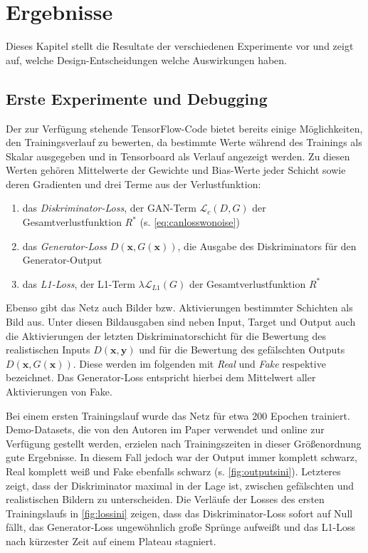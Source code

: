 \chapter{Ergebnisse}

Dieses Kapitel stellt die Resultate der verschiedenen Experimente vor und zeigt auf, welche Design-Entscheidungen welche Auswirkungen haben.



\section{Erste Experimente und Debugging}

Der zur Verfügung stehende TensorFlow-Code bietet bereits einige Möglichkeiten, den Trainingsverlauf zu bewerten, da bestimmte Werte während des Trainings als Skalar ausgegeben und in Tensorboard als Verlauf angezeigt werden.
Zu diesen Werten gehören Mittelwerte der Gewichte und Bias-Werte jeder Schicht sowie deren Gradienten und drei Terme aus der Verlustfunktion:

\begin{enumerate}
	\item das \emph{Diskriminator-Loss}, der GAN-Term $ \mathcal{L}_c(D, G) $ der Gesamtverlustfunktion $ R^* $ (s. \autoref{eq:canlosswonoise})
	\item das \emph{Generator-Loss} $ D(\mathbf{x}, G(\mathbf{x})) $, die Ausgabe des Diskriminators für den Generator-Output
	\item das \emph{L1-Loss}, der L1-Term $ \lambda \mathcal{L}_{L1}(G) $ der Gesamtverlustfunktion $ R^* $
\end{enumerate}

Ebenso gibt das Netz auch Bilder bzw. Aktivierungen bestimmter Schichten als Bild aus.
Unter diesen Bildausgaben sind neben Input, Target und Output auch die Aktivierungen der letzten Diskriminatorschicht für die Bewertung des realistischen Inputs $ D(\mathbf{x}, \mathbf{y}) $ und für die Bewertung des gefälschten Outputs $ D(\mathbf{x}, G(\mathbf{x})) $.
Diese werden im folgenden mit \emph{Real} und \emph{Fake} respektive bezeichnet.
Das Generator-Loss entspricht hierbei dem Mittelwert aller Aktivierungen von Fake.

Bei einem ersten Trainingslauf wurde das Netz für etwa 200 Epochen trainiert.
Demo-Datasets, die von den Autoren im Paper verwendet und online zur Verfügung gestellt werden, erzielen nach Trainingszeiten in dieser Größenordnung gute Ergebnisse.
In diesem Fall jedoch war der Output immer komplett schwarz, Real komplett weiß und Fake ebenfalls schwarz (s. \autoref{fig:outputsini}).
Letzteres zeigt, dass der Diskriminator maximal in der Lage ist, zwischen gefälschten und realistischen Bildern zu unterscheiden.
Die Verläufe der Losses des ersten Trainingslaufs in \autoref{fig:lossini} zeigen, dass das Diskriminator-Loss sofort auf Null fällt, das Generator-Loss ungewöhnlich große Sprünge aufweißt und das L1-Loss nach kürzester Zeit auf einem Plateau stagniert.

